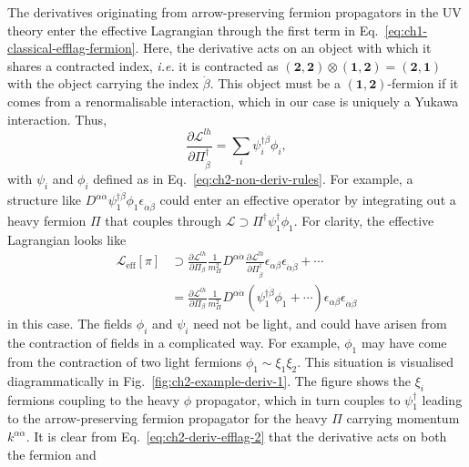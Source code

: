The derivatives originating from arrow-preserving fermion propagators in the UV
theory enter the effective Lagrangian through the first term in
Eq.~\eqref{eq:ch1-classical-efflag-fermion}. Here, the derivative acts on an object
with which it shares a contracted index, \textit{i.e.} it is contracted as
$(\mathbf{2}, \mathbf{2}) \otimes (\mathbf{1}, \mathbf{2}) = (\mathbf{2}, \mathbf{1})$
with the object carrying the index $\dot{\beta}$. This object must be a
$(\mathbf{1}, \mathbf{2})$-fermion if it comes from a renormalisable
interaction, which in our case is uniquely a Yukawa interaction. Thus,
\begin{equation}
  \label{eq:ch2-deriv-indices}
  \frac{\partial \mathscr{L}^{lh}}{\partial \Pi_{\dot{\beta}}^{\dagger}} = \sum_{i} \psi^{\dagger \dot{\beta}}_{i} \phi_{i} ,
\end{equation}
with $\psi_{i}$ and $\phi_{i}$ defined as in Eq.~\eqref{eq:ch2-non-deriv-rules}. For
example, a structure like
$D^{\alpha \dot{\alpha}} \psi_{1}^{\dagger \dot{\beta}} \phi_{1} \epsilon_{\dot{\alpha} \dot{\beta}}$
could enter an effective operator by integrating out a heavy fermion $\Pi$ that
couples through $\mathscr{L} \supset \Pi^{\dagger} \psi^{\dagger}_{1} \phi_{1}$.
For clarity, the effective Lagrangian looks like
\begin{align}
  \mathscr{L}_{\text{eff}}[\pi] &\supset \frac{\partial \mathscr{L}^{lh}}{\partial \Pi_{\beta}} \frac{1}{m_{\Pi}^{2}} D^{\alpha \dot{\alpha}} \frac{\partial \mathscr{L}^{lh}}{\partial \Pi^{\dagger}_{\dot{\beta}}}   \epsilon_{\alpha \beta} \epsilon_{\dot{\alpha} \dot{\beta}} + \cdots \\
  &= \frac{\partial \mathscr{L}^{lh}}{\partial \Pi_{\beta}} \frac{1}{m_{\Pi}^{2}} D^{\alpha \dot{\alpha}} \left( \psi_{1}^{\dagger \dot{\beta}} \phi_{1} + \cdots \right) \epsilon_{\alpha \beta} \epsilon_{\dot{\alpha} \dot{\beta}} \label{eq:ch2-deriv-efflag-2}
\end{align}
in this case. The fields $\phi_{i}$ and $\psi_{i}$ need not be light, and could
have arisen from the contraction of fields in a complicated way. For example,
$\phi_{1}$ may have come from the contraction of two light fermions
$\phi_{1} \sim \xi_{1} \xi_{2}$. This situation is visualised diagrammatically
in Fig.~\ref{fig:ch2-example-deriv-1}. The figure shows the $\xi_{i}$ fermions
coupling to the heavy $\phi$ propagator, which in turn couples to
$\psi_{1}^{\dagger}$ leading to the arrow-preserving fermion propagator for the
heavy $\Pi$ carrying momentum $k^{\alpha \dot{\alpha}}$. It is clear from
Eq.~\eqref{eq:ch2-deriv-efflag-2} that the derivative acts on both the fermion and
